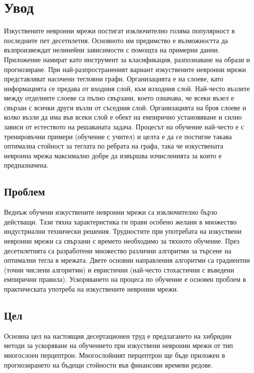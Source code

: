 ﻿
\chapter*{Увод}

Изкуствените невронни мрежи постигат изключително голяма популярност в последните пет десетилетия. Основното им предимство е възможността да възпроизвеждат нелинейни зависимости с помощта на примерни данни. Приложение намират като инструмент за класификация, разпознаване на образи и прогнозиране. При най-разпространеният вариант изкуствените невронни мрежи представляват насочени тегловни графи. Организацията е на слоеве, като информацията се предава от входния слой, към изходния слой. Най-често възлите между отделните слоеве са пълно свързани, което означава, че всеки възел е свързан с всички други възли от съседния слой. Организацията на броя слоеве и колко възли да има във всеки слой е обект на емпирично установяване и силно зависи от естеството на решаваната задача. Процесът на обучение най-често е с тренировъчни примери (обучение с учител) и целта е да се постигне такава оптимална стойност за теглата по ребрата на графа, така че изкуствената невронна мрежа максимално добре да извършва изчисленията за които е предназначена. 

\section*{Проблем}

Веднъж обучени изкуствените невронни мрежи са изключително бързо действащи. Тази тяхна характеристика ги прави особено желани в множество индустриални технически решения. Трудностите при употребата на изкуствени невронни мрежи са свързани с времето необходимо за тяхното обучение. През десетилетията са разработени множество различни алгоритми за търсене на оптимални тегла в мрежата. Двете основни направления алгоритми са градиентни (точни числени алгоритми) и евристични (най-често стохастични с въведени емпирични правила). Ускоряването на процеса по обучение е основен проблем в практическата употреба на изкуствените невронни мрежи.

\section*{Цел}

Основна цел на настоящия десертационен труд е предлагането на хибридни методи за ускоряване на обучението при изкуствени невронни мрежи от тип многослоен перцептрон. Многослойният перцептрон ще бъде приложен в прогнозирането на бъдещи стойности във финансови времеви редове. 


